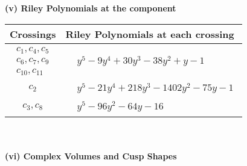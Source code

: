 \documentclass[1p]{elsarticle_modified}
\theoremstyle{definition}
\begin{document}
\newpage\renewcommand{\arraystretch}{1}
\flushleft \textbf{(v) Riley Polynomials at the component}\newline \\
\begin{tabular}{m{50pt}|m{274pt}}
Crossings & \hspace{64pt}Riley Polynomials at each crossing \\
\hline $$\begin{aligned}c_{1},c_{4},c_{5}\\c_{6},c_{7},c_{9}\\c_{10},c_{11}\end{aligned}$$&$\begin{aligned}
&y^5-9 y^4+30 y^3-38 y^2+y-1
\end{aligned}$\\
\hline $$\begin{aligned}c_{2}\end{aligned}$$&$\begin{aligned}
&y^5-21 y^4+218 y^3-1402 y^2-75 y-1
\end{aligned}$\\
\hline $$\begin{aligned}c_{3},c_{8}\end{aligned}$$&$\begin{aligned}
&y^5-96 y^2-64 y-16
\end{aligned}$\\
\hline
\end{tabular}\\~\\
\newpage\flushleft \textbf{(vi) Complex Volumes and Cusp Shapes}
\end{document}
